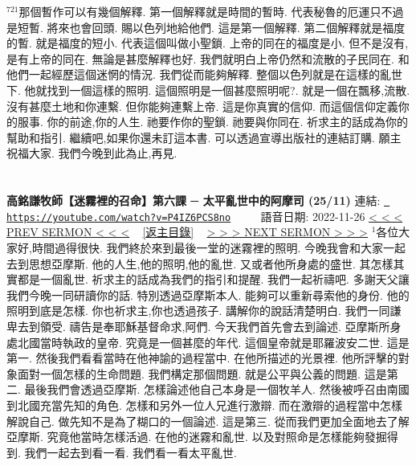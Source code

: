 \documentclass{book}
\begin{document}
$^{721}$那個暫作可以有幾個解釋.
第一個解釋就是時間的暫時.
代表秘魯的厄運只不過是短暫.
將來也會回頭.
賜以色列地給他們.
這是第一個解釋.
第二個解釋就是福度的暫.
就是福度的短小.
代表這個叫做小聖鎖.
上帝的同在的福度是小.
但不是沒有,是有上帝的同在.
無論是甚麼解釋也好.
我們就明白上帝仍然和流散的子民同在.
和他們一起經歷這個迷惘的情況.
我們從而能夠解釋.
整個以色列就是在這樣的亂世下.
他就找到一個這樣的照明.
這個照明是一個甚麼照明呢?.
就是一個在飄移,流散.
沒有甚麼土地和你連繫.
但你能夠連繫上帝.
這是你真實的信仰.
而這個信仰定義你的服事.
你的前途,你的人生.
祂要作你的聖鎖.
祂要與你同在.
祈求主的話成為你的幫助和指引.
繼續吧,如果你還未訂這本書.
可以透過宣導出版社的連結訂購.
願主祝福大家.
我們今晚到此為止,再見.
\newpage



\section{}
\label{sec:P4IZ6PCS8no}
\textbf{高銘謙牧師【迷霧裡的召命】第六課 ─ 太平亂世中的阿摩司 (25/11)}
\newline
\newline
連結: \href{https://youtube.com/watch?v=P4IZ6PCS8no}{\texttt{ https://youtube.com/watch?v=P4IZ6PCS8no}} ~~~~ 語音日期: 2022-11-26 
\newline
\newline
\hyperref[sec:FHx_k0UyGMs]{\small{< < < PREV SERMON < < <}}
~
\hyperref[sec:index]{\small{[返主目錄]}}
~
\hyperref[sec:gfNxrOBd_U0]{\small{> > > NEXT SERMON > > >}}
\newline
\newline
$^{1}$各位大家好,時間過得很快.
我們終於來到最後一堂的迷霧裡的照明.
今晚我會和大家一起去到思想亞摩斯.
他的人生,他的照明,他的亂世.
又或者他所身處的盛世.
其怎樣其實都是一個亂世.
祈求主的話成為我們的指引和提醒.
我們一起祈禱吧.
多謝天父讓我們今晚一同研讀你的話.
特別透過亞摩斯本人.
能夠可以重新尋索他的身份.
他的照明到底是怎樣.
你也祈求主,你也透過孩子.
講解你的說話清楚明白.
我們一同謙卑去到領受.
禱告是奉耶穌基督命求,阿們.
今天我們首先會去到論述.
亞摩斯所身處北國當時執政的皇帝.
究竟是一個甚麼的年代.
這個皇帝就是耶羅波安二世.
這是第一.
然後我們看看當時在他神諭的過程當中.
在他所描述的光景裡.
他所評擊的對象面對一個怎樣的生命問題.
我們構定那個問題.
就是公平與公義的問題.
這是第二.
最後我們會透過亞摩斯.
怎樣論述他自己本身是一個牧羊人.
然後被呼召由南國到北國充當先知的角色.
怎樣和另外一位人兄進行激辯.
而在激辯的過程當中怎樣解說自己.
做先知不是為了糊口的一個論述.
這是第三.
從而我們更加全面地去了解亞摩斯.
究竟他當時怎樣活過.
在他的迷霧和亂世.
以及對照命是怎樣能夠發掘得到.
我們一起去到看一看.
我們看一看太平亂世.
\end{document}

